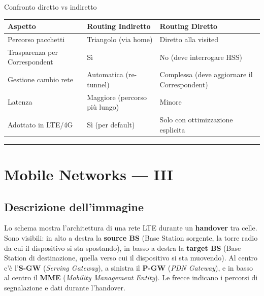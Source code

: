 \documentclass[
  italian,
  openany]{book}
\newcounter{none} %
\begin{document}
\begin{callouttip}{Confronto diretto vs indiretto}

{\def\LTcaptype{none} %
\begin{longtable}[]{@{}
  >{\raggedright\arraybackslash}p{}
  >{\raggedright\arraybackslash}p{}
  >{\raggedright\arraybackslash}p{}@{}}
\toprule\noalign{}
\begin{minipage}[b]{\linewidth}\raggedright
Aspetto
\end{minipage} & \begin{minipage}[b]{\linewidth}\raggedright
Routing Indiretto
\end{minipage} & \begin{minipage}[b]{\linewidth}\raggedright
Routing Diretto
\end{minipage} \\
\midrule\noalign{}
\endhead
\bottomrule\noalign{}
\endlastfoot
Percorso pacchetti & Triangolo (via home) & Diretto alla visited \\
Trasparenza per Correspondent & Sì & No (deve interrogare HSS) \\
Gestione cambio rete & Automatica (re-tunnel) & Complessa (deve
aggiornare il Correspondent) \\
Latenza & Maggiore (percorso più lungo) & Minore \\
Adottato in LTE/4G & Sì (per default) & Solo con ottimizzazione
esplicita \\
\end{longtable}
}

\end{callouttip}

\begin{center}\rule{0.5\linewidth}{0.5pt}\end{center}

\section{Mobile Networks --- III}\label{mobile-networks-iii}

\subsection{Descrizione dell'immagine}\label{descrizione-dellimmagine-5}

Lo schema mostra l'architettura di una rete LTE durante un
\textbf{handover} tra celle. Sono visibili: in alto a destra la
\textbf{source BS} (Base Station sorgente, la torre radio da cui il
dispositivo si sta spostando), in basso a destra la \textbf{target BS}
(Base Station di destinazione, quella verso cui il dispositivo si sta
muovendo). Al centro c'è l'\textbf{S-GW} (\emph{Serving Gateway}), a
sinistra il \textbf{P-GW} (\emph{PDN Gateway}), e in basso al centro il
\textbf{MME} (\emph{Mobility Management Entity}). Le frecce indicano i
percorsi di segnalazione e dati durante l'handover.
\end{document}
